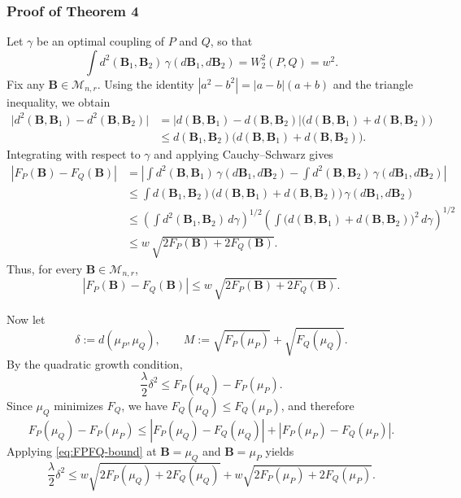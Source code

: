 \documentclass[12pt]{article}
\newcommand{\calMnr}{\mathcal{M}_{n,r}}
\newcommand{\bfB}{\boldsymbol{B}}
\begin{document}
\subsubsection*{Proof of Theorem 4}
Let $\gamma$ be an optimal coupling of $P$ and $Q$, so that
\[
\int d^2(\bfB_1,\bfB_2)\,\gamma(d\bfB_1,d\bfB_2)=W_2^2(P,Q)=w^2.
\]
Fix any $\bfB\in\calMnr$. Using the identity $|a^2-b^2|=|a-b|(a+b)$ and the triangle inequality,
we obtain
\begin{align*}
	\big|d^2(\bfB,\bfB_1)-d^2(\bfB,\bfB_2)\big|
	&=
	\big|d(\bfB,\bfB_1)-d(\bfB,\bfB_2)\big|
	\big(d(\bfB,\bfB_1)+d(\bfB,\bfB_2)\big) \\
	&\le
	d(\bfB_1,\bfB_2)\big(d(\bfB,\bfB_1)+d(\bfB,\bfB_2)\big).
\end{align*}
Integrating with respect to $\gamma$ and applying Cauchy--Schwarz gives
\begin{align*}
	|F_P(\bfB)-F_Q(\bfB)|
	&=
	\left|
	\int d^2(\bfB,\bfB_1)\,\gamma(d\bfB_1,d\bfB_2)
	-
	\int d^2(\bfB,\bfB_2)\,\gamma(d\bfB_1,d\bfB_2)
	\right| \\
	&\le
	\int d(\bfB_1,\bfB_2)\big(d(\bfB,\bfB_1)+d(\bfB,\bfB_2)\big)\,\gamma(d\bfB_1,d\bfB_2) \\
	&\le
	\left(\int d^2(\bfB_1,\bfB_2)\,d\gamma\right)^{1/2}
	\left(\int \big(d(\bfB,\bfB_1)+d(\bfB,\bfB_2)\big)^2\,d\gamma\right)^{1/2} \\
	&\le
	w\,\sqrt{2F_P(\bfB)+2F_Q(\bfB)}.
\end{align*}
Thus, for every $\bfB\in\calMnr$,
\begin{equation}\label{eq:FPFQ-bound}
	|F_P(\bfB)-F_Q(\bfB)|\le w\,\sqrt{2F_P(\bfB)+2F_Q(\bfB)}.
\end{equation}

Now let
\[
\delta := d(\mu_P,\mu_Q),\qquad
M := \sqrt{F_P(\mu_P)}+\sqrt{F_Q(\mu_Q)}.
\]
By the quadratic growth condition,
\begin{equation}\label{eq:qgrowth-muQ}
	\frac{\lambda}{2}\delta^2
	\le
	F_P(\mu_Q)-F_P(\mu_P).
\end{equation}
Since $\mu_Q$ minimizes $F_Q$, we have $F_Q(\mu_Q)\le F_Q(\mu_P)$, and therefore
\[
F_P(\mu_Q)-F_P(\mu_P)
\le
|F_P(\mu_Q)-F_Q(\mu_Q)| + |F_P(\mu_P)-F_Q(\mu_P)|.
\]
Applying \eqref{eq:FPFQ-bound} at $\bfB=\mu_Q$ and $\bfB=\mu_P$ yields
\begin{equation}\label{eq:two-term-bound}
	\frac{\lambda}{2}\delta^2
	\le
	w\sqrt{2F_P(\mu_Q)+2F_Q(\mu_Q)}
	+
	w\sqrt{2F_P(\mu_P)+2F_Q(\mu_P)}.
\end{equation}
\end{document}
